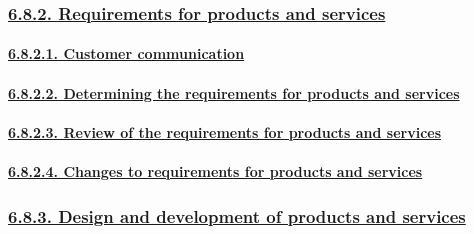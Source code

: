 \documentclass[
]{article}
\begin{document}
\hypertarget{requirements-for-products-and-services}{%
\subsubsection{\texorpdfstring{\protect\hyperlink{requirements-for-products-and-services-1}{6.8.2.
Requirements for products and
services}}{6.8.2. Requirements for products and services}}\label{requirements-for-products-and-services}}

\hypertarget{customer-communication}{%
\paragraph{\texorpdfstring{\protect\hyperlink{customer-communication-1}{6.8.2.1.
Customer
communication}}{6.8.2.1. Customer communication}}\label{customer-communication}}

\hypertarget{determining-the-requirements-for-products-and-services}{%
\paragraph{\texorpdfstring{\protect\hyperlink{determining-the-requirements-for-products-and-services-1}{6.8.2.2.
Determining the requirements for products and
services}}{6.8.2.2. Determining the requirements for products and services}}\label{determining-the-requirements-for-products-and-services}}

\hypertarget{review-of-the-requirements-for-products-and-services}{%
\paragraph{\texorpdfstring{\protect\hyperlink{review-of-the-requirements-for-products-and-services-1}{6.8.2.3.
Review of the requirements for products and
services}}{6.8.2.3. Review of the requirements for products and services}}\label{review-of-the-requirements-for-products-and-services}}

\hypertarget{changes-to-requirements-for-products-and-services}{%
\paragraph{\texorpdfstring{\protect\hyperlink{changes-to-requirements-for-products-and-services-1}{6.8.2.4.
Changes to requirements for products and
services}}{6.8.2.4. Changes to requirements for products and services}}\label{changes-to-requirements-for-products-and-services}}

\hypertarget{design-and-development-of-products-and-services}{%
\subsubsection{\texorpdfstring{\protect\hyperlink{design-and-development-of-products-and-services-1}{6.8.3.
Design and development of products and
services}}{6.8.3. Design and development of products and services}}\label{design-and-development-of-products-and-services}}
\end{document}
